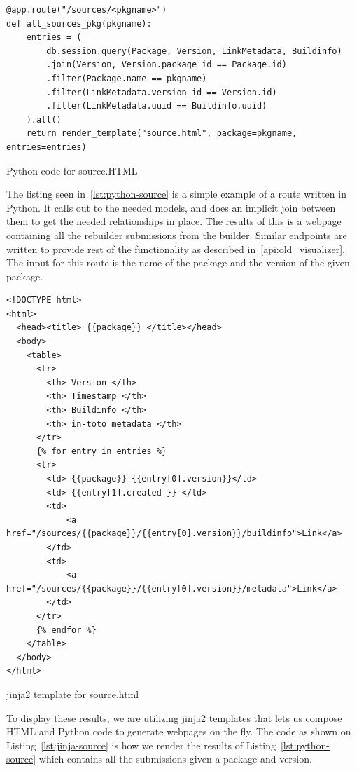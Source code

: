 \documentclass[../Main/thesis.tex]{subfiles}
\begin{document}
\begin{listing}[htpb]
\begin{verbatim}
@app.route("/sources/<pkgname>")
def all_sources_pkg(pkgname):
    entries = (
        db.session.query(Package, Version, LinkMetadata, Buildinfo)
        .join(Version, Version.package_id == Package.id)
        .filter(Package.name == pkgname)
        .filter(LinkMetadata.version_id == Version.id)
        .filter(LinkMetadata.uuid == Buildinfo.uuid)
    ).all()
    return render_template("source.html", package=pkgname, entries=entries)
\end{verbatim}
\caption{Python code for source.HTML}
\label{lst:python-source}
\end{listing}

The listing seen in~\ref{lst:python-source} is a simple example of a route
written in Python. It calls out to the needed models, and does an implicit join
between them to get the needed relationships in place. The results of this is a
webpage containing all the rebuilder submissions from the builder. Similar
endpoints are written to provide rest of the functionality as described
in~\ref{api:old_visualizer}. The input for this route is the name of the package
and the version of the given package.


\begin{listing}[H]
\begin{verbatim}
<!DOCTYPE html>
<html>
  <head><title> {{package}} </title></head>
  <body>
    <table>
      <tr>
        <th> Version </th>
        <th> Timestamp </th>
        <th> Buildinfo </th>
        <th> in-toto metadata </th>
      </tr>
      {% for entry in entries %}
      <tr>
        <td> {{package}}-{{entry[0].version}}</td>
        <td> {{entry[1].created }} </td>
        <td> 
            <a href="/sources/{{package}}/{{entry[0].version}}/buildinfo">Link</a>
        </td>
        <td> 
            <a href="/sources/{{package}}/{{entry[0].version}}/metadata">Link</a>
        </td>
      </tr>
      {% endfor %}
    </table>
  </body>
</html>
\end{verbatim}
\caption{jinja2 template for source.html}
\label{lst:jinja-source}
\end{listing}

To display these results, we are utilizing jinja2 templates that lets us compose
HTML and Python code to generate webpages on the fly. The code as shown on
Listing~\ref{lst:jinja-source} is how we render the results of
Listing~\ref{lst:python-source} which contains all the submissions given a
package and version.
\end{document}
